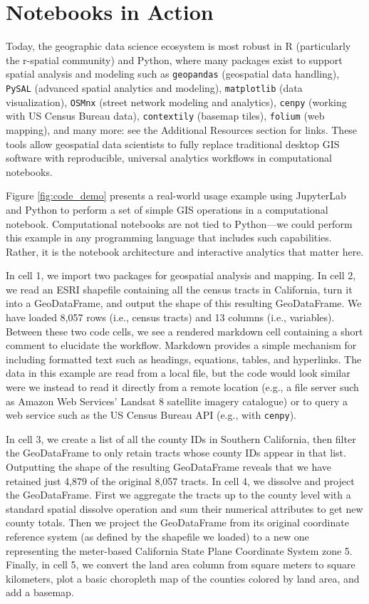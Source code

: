 \documentclass[11pt,letterpaper]{article}
\begin{document}
\section{Notebooks in Action}

Today, the geographic data science ecosystem is most robust in R (particularly the r-spatial community) and Python, where many packages exist to support spatial analysis and modeling such as \texttt{geopandas} (geospatial data handling), \texttt{PySAL} (advanced spatial analytics and modeling), \texttt{matplotlib} (data visualization), \texttt{OSMnx}  (street network modeling and analytics), \texttt{cenpy} (working with US Census Bureau data), \texttt{contextily} (basemap tiles), \texttt{folium} (web mapping), and many more: see the Additional Resources section for links. These tools allow geospatial data scientists to fully replace traditional desktop GIS software with reproducible, universal analytics workflows in computational notebooks.

Figure \ref{fig:code_demo} presents a real-world usage example using JupyterLab and Python to perform a set of simple GIS operations in a computational notebook. Computational notebooks are not tied to Python---we could perform this example in any programming language that includes such capabilities. Rather, it is the notebook architecture and interactive analytics that matter here.

In cell 1, we import two packages for geospatial analysis and mapping. In cell 2, we read an ESRI shapefile containing all the census tracts in California, turn it into a GeoDataFrame, and output the shape of this resulting GeoDataFrame. We have loaded 8,057 rows (i.e., census tracts) and 13 columns (i.e., variables). Between these two code cells, we see a rendered markdown cell containing a short comment to elucidate the workflow. Markdown provides a simple mechanism for including formatted text such as headings, equations, tables, and hyperlinks. The data in this example are read from a local file, but the code would look similar were we instead to read it directly from a remote location (e.g., a file server such as Amazon Web Services' Landsat 8 satellite imagery catalogue) or to query a web service such as the US Census Bureau API (e.g., with \texttt{cenpy}).

In cell 3, we create a list of all the county IDs in Southern California, then filter the GeoDataFrame to only retain tracts whose county IDs appear in that list. Outputting the shape of the resulting GeoDataFrame reveals that we have retained just 4,879 of the original 8,057 tracts. In cell 4, we dissolve and project the GeoDataFrame. First we aggregate the tracts up to the county level with a standard spatial dissolve operation and sum their numerical attributes to get new county totals. Then we project the GeoDataFrame from its original coordinate reference system (as defined by the shapefile we loaded) to a new one representing the meter-based California State Plane Coordinate System zone 5. Finally, in cell 5, we convert the land area column from square meters to square kilometers, plot a basic choropleth map of the counties colored by land area, and add a basemap.
\end{document}

